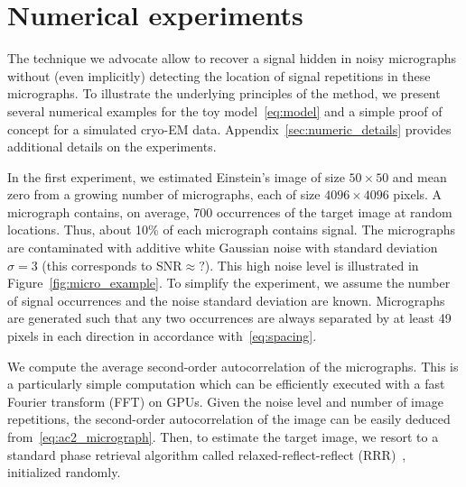 \documentclass[9pt,twocolumn,twoside,lineno]{pnas-new}
\begin{document}
\section{Numerical experiments}



The technique we advocate allow to recover a signal hidden in noisy micrographs without (even implicitly) detecting the location of signal repetitions in these micrographs. To illustrate the underlying principles of the method, we present several numerical examples for the toy model~\eqref{eq:model} and a simple proof of concept for a simulated cryo-EM data.  Appendix~\ref{sec:numeric_details} provides additional details on the experiments.


In the first experiment, we estimated Einstein's image of size $50\times 50$ and mean zero from a growing number of micrographs, each of size $4096\times 4096$ pixels. A micrograph contains, on average, 700 occurrences of the target image at random locations. 
Thus, about 10\% of each micrograph contains signal. The micrographs are contaminated with additive white Gaussian noise with standard deviation $\sigma=3$ (this corresponds to SNR$\approx ?$). This high noise level is illustrated in Figure~\ref{fig:micro_example}. 
To simplify the experiment, we assume the number of signal occurrences and the noise standard deviation are known. Micrographs are generated such that any two occurrences are always separated by at least 49 pixels in each direction in accordance with~\eqref{eq:spacing}. %

We compute the average second-order autocorrelation of the micrographs. This is a particularly simple computation which can be efficiently executed with a fast Fourier transform (FFT) on GPUs. Given the noise level and number of image repetitions, the second-order autocorrelation of the image can be easily deduced from~\eqref{eq:ac2_micrograph}.  Then, to estimate the target image, we resort to a standard phase retrieval algorithm called relaxed-reflect-reflect (RRR)~\cite{elser2017rrr}, initialized randomly.
\end{document}
